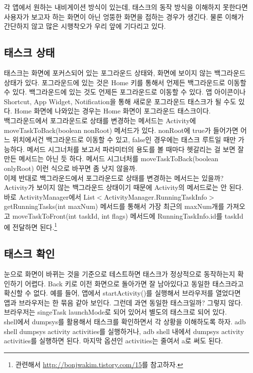 각 앱에서 원하는 내비게이션 방식이 있는데, 태스크의 동작 방식을 이해하지 못한다면 사용자가 보고자 하는 화면이 아닌 엉뚱한 화면을 접하는 경우가 생긴다. 물론 이해가 간단하지 않고 많은 시행착오가 우리 앞에 기다리고 있다.

\subsection{태스크 상태}
태스크는 화면에 포커스되어 있는 포그라운드 상태와, 화면에 보이지 않는 백그라운드 상태가 있다. 포그라운드에 있는 것은 Home 키를 통해서 언제든 백그라운드로 이동할 수 있다.
백그라운드에 있는 것도 언제든 포그라운드로 이동할 수 있다. 앱 아이콘이나 Shortcut, App Widget, Notification을 통해 새로운 포그라운드 태스크가 될 수도 있다. Home 화면에 나와있는 경우는 Home 화면이 포그라운드 태스크이다.\\

백그라운드에서 포그라운드로 상태를 변경하는 메서드는 Activity에 moveTaskToBack(boolean nonRoot) 메서드가 있다. nonRoot에 true가 들어가면 어느 위치에서건 백그라운드로 이동할 수 있고, false인 경우에는 태스크 루트일 때만 가능하다. 
메서드 시그너처를 보고서 파라미터의 용도를 볼 때마다 헷갈리는 걸 보면 잘 만든 메서드는 아닌 듯 하다. 메서드 시그너처를 moveTaskToBack(boolean onlyRoot) 이런 식으로 바꾸면 좀 낫지 않을까. \\

이제 반대로 백그라운드에서 포그라운드로 상태를 변경하는 메서드는 있을까? 
Activity가 보이지 않는 백그라운드 상태이기 때문에 Activity의 메서드로는 안 된다.
바로 ActivityManager에서 
List$<$ActivityManager.Running\-TaskInfo$>$ getRunningTasks(int maxNum) 메서드를 통해서 가장 최근의 maxNum개를 가져오고 moveTaskToFront(int taskId, int flags) 메서드에 RunningTaskInfo.id를 taskId에 전달하면 된다.\footnote{관련해서 \url{http://bonjwakim.tistory.com/15}를 참고하자.}

\subsection{태스크 확인}
눈으로 화면이 바뀌는 것을 기준으로 테스트하면 태스크가 정상적으로 동작하는지 확인하기 어렵다. Back 키로 이전 화면으로 돌아가면 잘 남아있다고 동일한 태스크라고 확신할 수 없다.
예를 들어, 앱에서 startActivity()를 실행해서 브라우저를 열었다면 앱과 브라우저는 한 묶음 같아 보인다. 그런데 과연 동일한 태스크일까? 그렇지 않다. 브라우저는 singeTask launchMode로 되어 있어서 별도의 태스크로 되어 있다.\\

shell에서 dumpsys를 활용해서 태스크를 확인하면서 각 상황을 이해하도록 하자.
adb shell dumpsys activity activities를 실행하거나, adb shell 내에서 dumpsys activity activities를 실행하면 된다. 마지막 옵션인 activities는 줄여서 a로 써도 된다.\\

